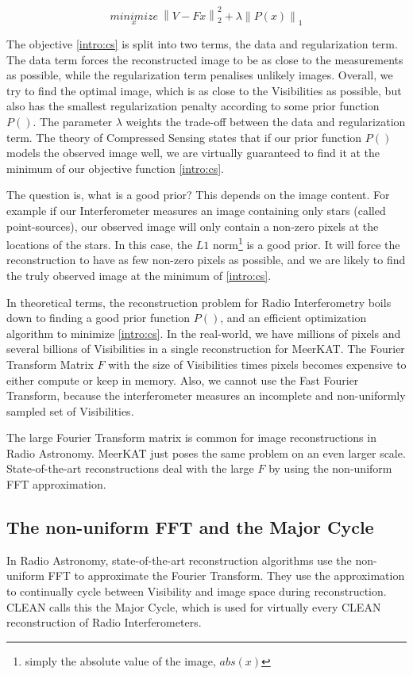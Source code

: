 \begin{equation}\label{intro:cs}
\underset{x}{minimize} \: \left \| V - Fx \right \|_2^2 + \lambda \left \| P(x) \right \|_1
\end{equation}

The objective \eqref{intro:cs} is split into two terms, the data and regularization term. The data term forces the reconstructed image to be as close to the measurements as possible, while the regularization term penalises unlikely images. Overall, we try to find the optimal image, which is as close to the Visibilities as possible, but also has the smallest regularization penalty according to some prior function $P()$. The parameter $\lambda$ weights the trade-off between the data and regularization term. The theory of Compressed Sensing states that if our prior function $P()$ models the observed image well, we are virtually guaranteed to find it at the minimum of our objective function \eqref{intro:cs}.

The question is, what is a good prior? This depends on the image content. For example if our Interferometer measures an image containing only stars (called point-sources), our observed image will only contain a non-zero pixels at the locations of the stars. In this case, the $L1$ norm\footnote{simply the absolute value of the image, $abs(x)$} is a good prior. It will force the reconstruction to have as few non-zero pixels as possible, and we are likely to find the truly observed image at the minimum of \eqref{intro:cs}.

In theoretical terms, the reconstruction problem for Radio Interferometry boils down to finding a good prior function $P()$, and an efficient optimization algorithm to minimize \eqref{intro:cs}. In the real-world, we have millions of pixels and several billions of Visibilities in a single reconstruction for MeerKAT. The Fourier Transform Matrix $F$ with the size of Visibilities times pixels becomes expensive to either compute or keep in memory. Also, we cannot use the Fast Fourier Transform, because the interferometer measures an incomplete and non-uniformly sampled set of Visibilities.

The large Fourier Transform matrix is common for image reconstructions in Radio Astronomy. MeerKAT just poses the same problem on an even larger scale.
State-of-the-art reconstructions deal with the large $F$ by using the non-uniform FFT approximation.

\subsection{The non-uniform FFT and the Major Cycle}\label{intro:nufft}
In Radio Astronomy, state-of-the-art reconstruction algorithms use the non-uniform FFT to approximate the Fourier Transform. They use the approximation to continually cycle between Visibility and image space during reconstruction. CLEAN calls this the Major Cycle, which is used for virtually every CLEAN reconstruction of Radio Interferometers. 

